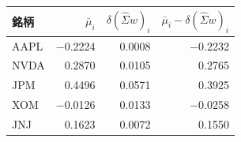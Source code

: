 \begin{tabular}{lrrr}
\toprule
銘柄 & $\bar\mu_i$ & $\delta(\hat\Sigma w)_i$ & $\bar\mu_i - \delta(\hat\Sigma w)_i$ \\
\midrule
AAPL & \ensuremath{-}0.2224 & 0.0008 & \ensuremath{-}0.2232 \\
NVDA & 0.2870 & 0.0105 & 0.2765 \\
JPM & 0.4496 & 0.0571 & 0.3925 \\
XOM & \ensuremath{-}0.0126 & 0.0133 & \ensuremath{-}0.0258 \\
JNJ & 0.1623 & 0.0072 & 0.1550 \\
\bottomrule
\end{tabular}
